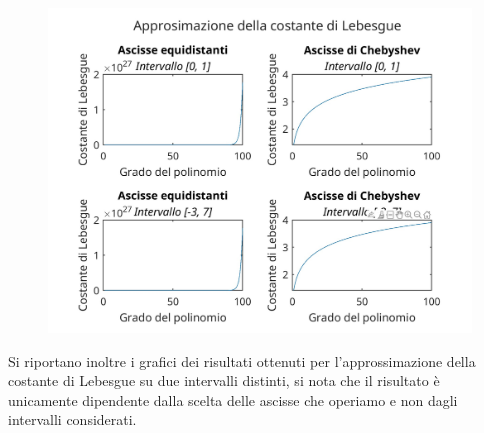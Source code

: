 \documentclass[10pt,a4paper]{article}
\begin{document}
\begin{figure}[h]
  \centering
  \includegraphics[width=1.1\textwidth]{../figure/plot20}  
\end{figure}


Si riportano inoltre i grafici dei risultati ottenuti per l'approssimazione della costante di Lebesgue su due intervalli distinti, si nota che il risultato è unicamente dipendente dalla scelta delle ascisse che operiamo e non dagli intervalli considerati.
\clearpage

\section{}
\end{document}
